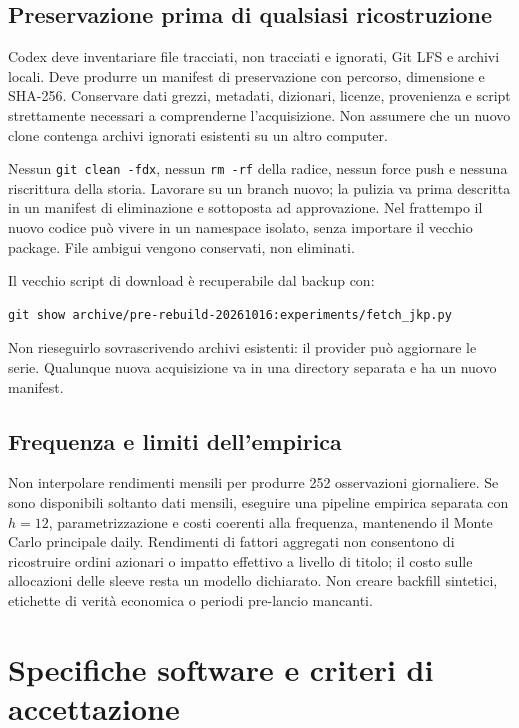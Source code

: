 \documentclass[11pt,a4paper]{article}
\theoremstyle{definition}\newtheorem{definition}[theorem]{Definizione}
\theoremstyle{remark}\newtheorem{remark}[theorem]{Osservazione}
\begin{document}
\subsection{Preservazione prima di qualsiasi ricostruzione}
Codex deve inventariare file tracciati, non tracciati e ignorati, Git LFS e archivi locali. Deve produrre un manifest di preservazione con percorso, dimensione e SHA-256. Conservare dati grezzi, metadati, dizionari, licenze, provenienza e script strettamente necessari a comprenderne l'acquisizione. Non assumere che un nuovo clone contenga archivi ignorati esistenti su un altro computer.

Nessun \texttt{git clean -fdx}, nessun \texttt{rm -rf} della radice, nessun force push e nessuna riscrittura della storia. Lavorare su un branch nuovo; la pulizia va prima descritta in un manifest di eliminazione e sottoposta ad approvazione. Nel frattempo il nuovo codice può vivere in un namespace isolato, senza importare il vecchio package. File ambigui vengono conservati, non eliminati.

Il vecchio script di download è recuperabile dal backup con:
\begin{lstlisting}
git show archive/pre-rebuild-20261016:experiments/fetch_jkp.py
\end{lstlisting}
Non rieseguirlo sovrascrivendo archivi esistenti: il provider può aggiornare le serie. Qualunque nuova acquisizione va in una directory separata e ha un nuovo manifest.

\subsection{Frequenza e limiti dell'empirica}
Non interpolare rendimenti mensili per produrre 252 osservazioni giornaliere. Se sono disponibili soltanto dati mensili, eseguire una pipeline empirica separata con $h=12$, parametrizzazione e costi coerenti alla frequenza, mantenendo il Monte Carlo principale daily. Rendimenti di fattori aggregati non consentono di ricostruire ordini azionari o impatto effettivo a livello di titolo; il costo sulle allocazioni delle sleeve resta un modello dichiarato. Non creare backfill sintetici, etichette di verità economica o periodi pre-lancio mancanti.

\section{Specifiche software e criteri di accettazione}
\label{sec:software}
\end{document}
